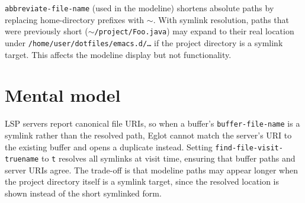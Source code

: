 \texttt{abbreviate-file-name} (used in the modeline) shortens absolute paths by replacing home-directory prefixes with \texttt{$\sim$}. With symlink resolution, paths that were previously short (\texttt{$\sim$/project/Foo.java}) may expand to their real location under \texttt{/home/user/dotfiles/emacs.d/…} if the project directory is a symlink target. This affects the modeline display but not functionality.

\section{Mental model}
LSP servers report canonical file URIs, so when a buffer's
\texttt{buffer-file-name} is a symlink rather than the resolved path, Eglot
cannot match the server's URI to the existing buffer and opens a duplicate
instead.  Setting \texttt{find-file-visit-truename} to \texttt{t} resolves
all symlinks at visit time, ensuring that buffer paths and server URIs agree.
The trade-off is that modeline paths may appear longer when the project
directory itself is a symlink target, since the resolved location is shown
instead of the short symlinked form.
